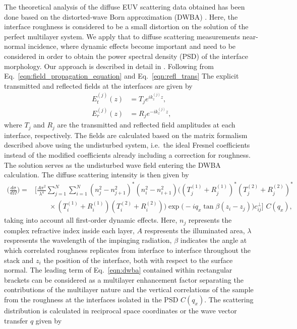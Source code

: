 \documentclass{iucr}              %
\begin{document}
The theoretical analysis of the diffuse EUV scattering data obtained has been done based on the distorted-wave Born approximation (DWBA) \cite{PhysRevB.49.10668,PhysRevB.47.15896}. Here, the interface roughness is considered to be a small distortion on the solution of the perfect multilayer system. We apply that to diffuse scattering measurements near-normal incidence, where dynamic effects become important and need to be considered in order to obtain the power spectral density (PSD) of the interface morphology. Our approach is described in detail in \cite{Haase:14}. Following from Eq.~\eqref{eqn:field_propagation_equation} and Eq.~\eqref{eqn:refl_trans} The explicit transmitted and reflected fields at the interfaces are given by
\begin{align}
	E_t^{(j)}(z) &= T_{j} e^{i k_z^{(j)} z} \text{,} \\
	E_r^{(j)}(z) &= R_{j} e^{-i k_z^{(j)} z} \text{,}
\end{align}
where $T_{j}$ and $R_{j}$ are the transmitted and reflected field amplitudes at each interface, respectively. The fields are calculated based on the matrix formalism described above using the undisturbed system, i.e.~the ideal Fresnel coefficients instead of the modified coefficients already including a correction for roughness. The solution serves as the undisturbed wave field entering the DWBA calculation. The diffuse scattering intensity is then given by
\onecolumn
    \begin{align}
        \Big(\frac{d \sigma}{d \Omega}\Big) = &\Bigg[\frac{A \pi^2}{\lambda^4}\sum \limits_{j=1}^{N}\sum \limits_{i=1}^{N} (n_j^2 - n_{j+1}^2)^* (n_i^2 - n_{i+1}^2)\Big( (T^{(1)}_j + R^{(1)}_j)^* (T^{(2)}_j + R^{(2)}_j)^* \nonumber \\ &\qquad\times(T^{(1)}_i + R^{(1)}_i) (T^{(2)}_i + R^{(2)}_i) \Big) \exp\Big(-i q_x \tan \beta (z_i-z_j)\Big) c^\perp_{i j}\Bigg]\,\, C(q_x) \text{,} \label{eqn:dwba}
    \end{align}
\twocolumn
taking into account all first-order dynamic effects. Here, $n_j$ represents the complex refractive index inside each layer, $A$ respresents the illuminated area, $\lambda$ respresents the wavelength of the impinging radiation, $\beta$ indicates the angle at which correlated roughness replicates from interface to interface throughout the stack and $z_i$ the position of the interface, both with respect to the surface normal. The leading term of Eq.~\eqref{eqn:dwba} contained within rectangular brackets can be considered as a multilayer enhancement factor separating the contributions of the multilayer nature and the vertical correlations of the sample from the roughness at the interfaces isolated in the PSD $C(q_x)$. The scattering distribution is calculated in reciprocal space coordinates or the wave vector transfer $q$ given by
\end{document}
